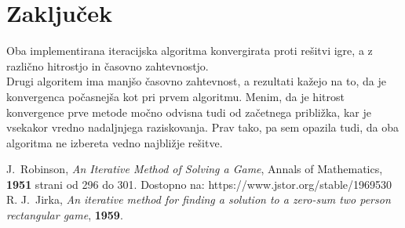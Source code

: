 \documentclass[a4paper,12pt]{article}
\begin{document}
\section{Zaključek}

Oba implementirana iteracijska algoritma konvergirata proti rešitvi igre, a z različno hitrostjo in časovno zahtevnostjo. \\
Drugi algoritem ima manjšo časovno zahtevnost, a rezultati kažejo na to, da je konvergenca počasnejša kot pri prvem algoritmu.
Menim, da je hitrost konvergence prve metode močno odvisna tudi od začetnega približka, kar je vsekakor vredno nadaljnjega raziskovanja.
Prav tako, pa sem opazila tudi, da oba algoritma ne izbereta vedno najbližje rešitve.

 
\begin{thebibliography}{99}
    J.~Robinson, \emph{An Iterative Method of Solving a Game},  Annals of Mathematics, \textbf{1951}  strani od 296 do 301. Dostopno na: https://www.jstor.org/stable/1969530
  R. J.~Jirka, \emph{An iterative method for finding a solution to a zero-sum two person rectangular game}, \textbf{1959}.
\end{thebibliography}
    
\end{document}
